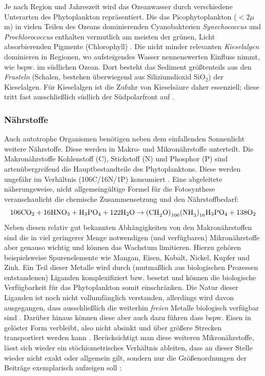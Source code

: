 \documentclass[12pt,a4paper,onecolumn]{scrartcl}
\newcommand{\cotwo}{CO\textsubscript{2}}
\begin{document}
Je nach Region und Jahreszeit wird das Ozeanwasser durch verschiedene Unterarten des Phytoplankton repräsentiert. Die das Picophytoplankton ($<2\mu$m) in vielen Teilen des Ozeans dominierenden Cyanobakterien \textit{Synechococcus} und \textit{Prochlorococcus} enthalten vermutlich am meisten der grünen, Licht absorbierenden Pigmente (Chlorophyll) \citep{Emerson.2009}. Die nicht minder relevanten \textit{Kieselalgen} dominieren in Regionen, wo aufsteigendes Wasser nennenswerten Einfluss nimmt, wie bspw. im südlichen Ozean. Dort besteht das Sediment größtenteils aus den \textit{Frusteln} (Schalen, bestehen überwiegend aus Siliziumdioxid SiO$_2$) der Kieselalgen. Für Kieselalgen ist die Zufuhr von Kieselsäure daher essenziell; diese tritt fast ausschließlich südlich der Südpolarfront auf \citep{Falkowski.1998}.

\subsubsection{Nährstoffe} \label{sec:nährstoffe}
Auch autotrophe Organismen benötigen neben dem einfallenden Sonnenlicht weitere Nährstoffe. Diese werden in Makro- und Mikronährstoffe unterteilt. Die Makronährstoffe Kohlenstoff (C), Stickstoff (N) und Phosphor (P) sind artenübergreifend die Hauptbestandteile des Phytoplanktons. Diese werden ungefähr im Verhältnis (106C/16N/1P) konsumiert \citep{Falkowski.1998}. Eine abgeleitete näherungsweise, nicht allgemeingültige Formel für die Fotosynthese  \citep{Emerson.2009} veranschaulicht die chemische Zusammensetzung und den Nährstoffbedarf:
\begin{equation}
\text{106\cotwo} + \text{16HNO}_3 + \text{H}_3\text{PO}_4 + \text{122H}_2\text{O} \rightarrow \text{(CH}_2\text{O)}_{106}\text{(NH}_3\text{)}_{16}\text{H}_3\text{PO}_4 + \text{138O}_2
\end{equation}
Neben diesen relativ gut bekannten Abhängigkeiten von den Makronährstoffen sind die in viel geringerer Menge notwendigen (und verfügbaren) Mikronährstoffe aber genauso wichtig und können das Wachstum limitieren. Hierzu gehören beispielsweise Spurenelemente wie Mangan, Eisen, Kobalt, Nickel, Kupfer und Zink. Ein Teil dieser Metalle wird durch (mutmaßlich aus biologischen Prozessen entstandenen) Liganden komplexifiziert bzw. besetzt und können die biologische Verfügbarkeit für das Phytoplankton somit einschränken. Die Natur dieser Liganden ist noch nicht vollumfänglich verstanden, allerdings wird davon ausgegangen, dass ausschließlich die weiterhin \textit{freien} Metalle biologisch verfügbar sind \citep{Emerson.2009}. Darüber hinaus können diese aber auch dazu führen dass bspw. Eisen in gelöster Form verbleibt, also nicht absinkt und über größere Strecken transportiert werden kann \citep{Tagliabue.2017}. Berücksichtigt man diese weiteren Mikronährstoffe, lässt sich wieder ein stöchiometrisches Verhältnis ableiten, dass an dieser Stelle wieder nicht exakt oder allgemein gilt, sondern nur die Größenordnungen der Beiträge exemplarisch aufzeigen soll \citep{Emerson.2009}:
\end{document}
